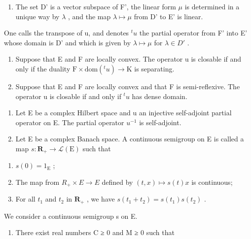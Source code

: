 \begin{enumerate}
\def\labelenumi{\alph{enumi})}
\tightlist
\item
  The set D' is a vector subspace of F', the linear form \(\mu\) is determined in a unique way by \(\lambda\) , and the map \(\lambda \mapsto \mu\) from D' to E' is linear.
\end{enumerate}

One calls the transpose of u, and denotes \(^{t}u\) the partial operator from F' into E' whose domain is D' and which is given by \(\lambda\mapsto\mu\) for \(\lambda\in D'\) .

\begin{enumerate}
\def\labelenumi{\alph{enumi})}
\setcounter{enumi}{1}
\item
  Suppose that E and F are locally convex. The operator u is closable if and only if the duality \(\mathrm{F} \times \mathrm{dom}(^{t}u) \to \mathrm{K}\) is separating.
\item
  Suppose that E and F are locally convex and that F is semi-reflexive. The operator u is closable if and only if \(^{t}u\) has dense domain.
\end{enumerate}

\begin{enumerate}
\def\labelenumi{\arabic{enumi})}
\setcounter{enumi}{3}
\item
  Let E be a complex Hilbert space and u an injective self-adjoint partial operator on E. The partial operator \(u^{-1}\) is self-adjoint.
\item
  Let E be a complex Banach space. A continuous semigroup on E is called a map \(s\colon\mathbf{R}_{+}\to\mathcal{L}(\mathrm{E})\) such that
\end{enumerate}

\begin{enumerate}
\def\labelenumi{(\roman{enumi})}
\item
  \(s(0) = 1_{\mathrm{E}}\) ;
\item
  The map from \(R_{+} \times E \to E\) defined by \((t, x) \mapsto s(t)x\) is continuous;
\item
  For all \(t_1\) and \(t_2\) in \(\mathbf{R}_{+}\) , we have \(s(t_1 + t_2) = s(t_1)s(t_2)\) .
\end{enumerate}

We consider a continuous semigroup s on E.

\begin{enumerate}
\def\labelenumi{\alph{enumi})}
\tightlist
\item
  There exist real numbers C ≥ 0 and M ≥ 0 such that
\end{enumerate}

